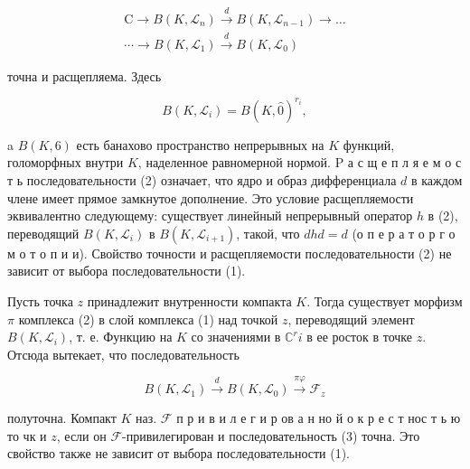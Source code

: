 \documentclass[10pt]{article}
\begin{document}
\[

\begin{gathered}

\mathrm{C} \longrightarrow B\left(K, \mathscr{L}_{n}\right) \stackrel{d}{\longrightarrow} B\left(K, \mathscr{L}_{n-1}\right) \longrightarrow \ldots \\

\cdots \longrightarrow B\left(K, \mathscr{L}_{1}\right) \stackrel{d}{\longrightarrow} B\left(K, \mathscr{L}_{0}\right)

\end{gathered}

\]



точна и расщепляема. Здесь



\[

B\left(K, \mathscr{L}_{i}\right)=B(K, \hat{0})^{r_{i}},

\]



a $B(K, 6)$ есть банахово пространство непрерывных на $K$ функций, голоморфных внутри $K$, наделенное равномерной нормой. $\mathrm{P}$ а с щ е п л я е м о с т ь последовательности (2) означает, что ядро и образ дифференциала $d$ в каждом члене имеет прямое замкнутое дополнение. Это условие расщепляемости эквивалентно следующему: существует линейный непрерывный оператор $h$ в (2), переводящий $B\left(K, \mathscr{L}_{i}\right)$ в $B\left(K, \mathscr{L}_{i+1}\right)$, такой, что $d h d=d$ (о п е р а т о р г о м о т о п и и). Свойство точности и расщепляемости последовательности (2) не зависит от выбора последовательности (1).



Пусть точка $z$ принадлежит внутренности компакта $K$. Тогда существует морфизм $\pi$ комплекса (2) в слой комплекса (1) над точкой $z$, переводящий элемент $B\left(K, \mathscr{L}_{i}\right)$, т. е. Функцию на $K$ со значениями в $\mathbb{C}^{r} i$ в ее росток в точке $z$. Отсюда вытекает, что последовательность



\[

B\left(K, \mathscr{L}_{1}\right) \stackrel{d}{\longrightarrow} B\left(K, \mathscr{L}_{0}\right) \stackrel{\pi \varphi}{\longrightarrow} \mathscr{F}_{z}

\]



полуточна. Компакт $K$ наз. $\mathscr{F}$ п р и в и л е г и р ов а н но й о к р е с т нос т ь ю то чк и $z$, если он $\mathscr{F}$-привилегирован и последовательность (3) точна. Это свойство также не зависит от выбора последовательности (1).
\end{document}
